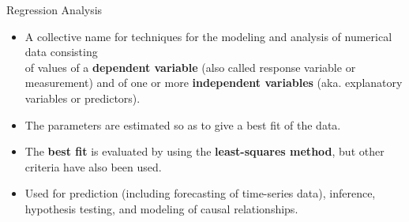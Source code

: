 \begin{frame}{Regression Analysis}
	\begin{itemize}
		\item A collective name for techniques for the modeling and analysis of 
		numerical data consisting \\ of values of a 
		\textbf{{\color{airforceblue}dependent variable}} (also called response 
		variable or measurement) and of one or more 
		\textbf{{\color{airforceblue}independent variables}} (aka. explanatory 
		variables or predictors).
		\item The parameters are estimated so as to give a best fit of the data.
		\item The \textbf{{\color{airforceblue}best fit}} is evaluated by using 
		the \textbf{{\color{airforceblue}least-squares method}}, but other 
		criteria have also been used.
		\item Used for prediction (including forecasting of time-series data), 
		inference, hypothesis testing, and modeling of causal relationships.
	\end{itemize}
	\hspace{4.5cm}
\end{frame}

